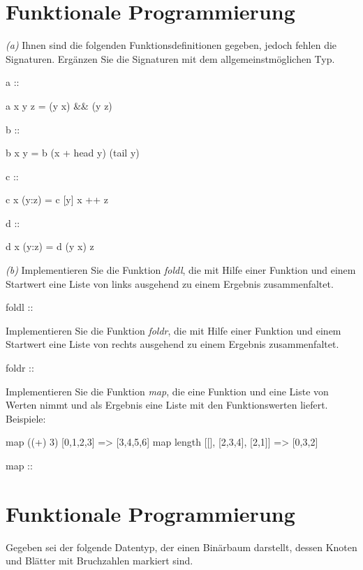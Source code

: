 \documentclass[11pt,a4paper,oneside,ngerman]{scrbook}
\begin{document}
\begin{itemize}[label={\Square \ \Square}]
\end{itemize}


\newpage

\section{Funktionale Programmierung}


\emph{(a)} Ihnen sind die folgenden Funktionsdefinitionen gegeben, jedoch fehlen die Signaturen. Ergänzen Sie die Signaturen mit dem allgemeinstmöglichen Typ.
\begin{code}
  a :: 

  a x y z = (y x) && (y z)

  
  b :: 
  
  b x y = b (x + head y) (tail y)

  
  c ::
  
  c x (y:z) = c [y] x ++ z

  
  d ::
  
  d x (y:z) = d (y x) z
\end{code}



\emph{(b)} Implementieren Sie die Funktion \emph{foldl}, die mit Hilfe einer Funktion und einem Startwert eine Liste von links ausgehend zu einem Ergebnis zusammenfaltet.

\begin{code}
  foldl :: 


\end{code}

Implementieren Sie die Funktion \emph{foldr}, die mit Hilfe einer Funktion und einem Startwert eine Liste von rechts ausgehend zu einem Ergebnis zusammenfaltet.

\begin{code}
  foldr :: 


\end{code}

Implementieren Sie die Funktion \emph{map}, die eine Funktion und eine Liste von Werten nimmt und als Ergebnis eine Liste mit den Funktionswerten liefert. Beispiele:
\begin{code}
  map ((+) 3) [0,1,2,3]             => [3,4,5,6]
  map length [[], [2,3,4], [2,1]]   => [0,3,2]

  map :: 


\end{code}

\newpage



\section{Funktionale Programmierung}
Gegeben sei der folgende Datentyp, der einen Binärbaum darstellt, dessen Knoten und Blätter mit Bruchzahlen markiert sind.
\end{document}
